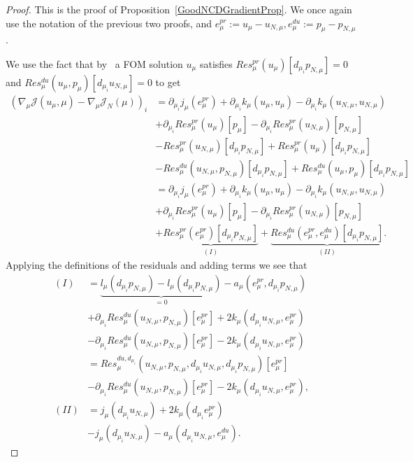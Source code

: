\begin{proof}
    This is the proof of Proposition~\ref{GoodNCDGradientProp}.
    We once again use the notation of the previous two proofs, and $e_\mu^{pr} := u_\mu - u_{N, \mu}, e_\mu^{du} := p_\mu - p_{N, \mu}$.

    We use the fact that by~\cite[Equations 3.1 and 3.2]{Keil2021} a FOM solution $u_\mu$ satisfies $Res_\mu^{pr}(u_\mu)[d_{\mu_i} p_{N, \mu}] = 0$ and $Res_\mu^{du}(u_\mu, p_\mu)[d_{\mu_i} u_{N, \mu}] = 0$ to get
    \begin{align}
        {\left( \nabla_\mu \mathcal{J}(u_\mu, \mu) - \nabla_\mu \mathcal{J}_N(\mu) \right)}_i &= \partial_{\mu_i} j_\mu(e_\mu^{pr}) + \partial_{\mu_i} k_\mu(u_\mu, u_\mu) - \partial_{\mu_i} k_\mu(u_{N, \mu}, u_{N, \mu}) \label{PrfEq5}\\
        &+ \partial_{\mu_i} Res_\mu^{pr}(u_\mu)[p_\mu] - \partial_{\mu_i} Res_\mu^{pr}(u_{N, \mu})[p_{N, \mu}] \nonumber\\
        &- Res_\mu^{pr}(u_{N, \mu})[d_{\mu_i} p_{N, \mu}] + Res_\mu^{pr}(u_\mu)[d_{\mu_i} p_{N, \mu}] \nonumber\\
        &- Res_\mu^{du}(u_{N, \mu}, p_{N, \mu})[d_{\mu_i} p_{N, \mu}] + Res_\mu^{du}(u_\mu, p_\mu)[d_{\mu_i} p_{N, \mu}] \nonumber\\
        &= \partial_{\mu_i} j_\mu(e_\mu^{pr}) + \partial_{\mu_i} k_\mu(u_\mu, u_\mu) - \partial_{\mu_i} k_\mu(u_{N, \mu}, u_{N, \mu}) \nonumber\\
        &+ \partial_{\mu_i} Res_\mu^{pr}(u_\mu)[p_\mu] - \partial_{\mu_i} Res_\mu^{pr}(u_{N, \mu})[p_{N, \mu}] \nonumber\\
        &+ \underbrace{Res_\mu^{pr}(e_\mu^{pr})[d_{\mu_i} p_{N, \mu}]}_{(I)} + \underbrace{Res_\mu^{du}(e_\mu^{pr}, e_\mu^{du})[d_{\mu_i} p_{N, \mu}]}_{(II)}. \nonumber
    \end{align}
    Applying the definitions of the residuals and adding terms we see that
    \begin{align}
        (I) &= \underbrace{l_\mu(d_{\mu_i} p_{N, \mu}) - l_\mu(d_{\mu_i} p_{N, \mu})}_{= 0} - a_\mu(e_\mu^{pr}, d_{\mu_i} p_{N, \mu}) \label{PrfEq6}\\
        &+ \partial_{\mu_i} Res_\mu^{du}(u_{N, \mu}, p_{N, \mu})[e_\mu^{pr}] + 2 k_\mu(d_{\mu_i} u_{N, \mu}, e_\mu^{pr}) \nonumber\\
        &- \partial_{\mu_i} Res_\mu^{du}(u_{N, \mu}, p_{N, \mu})[e_\mu^{pr}] - 2 k_\mu(d_{\mu_i} u_{N, \mu}, e_\mu^{pr}) \nonumber\\
        &= Res_\mu^{du, d_{\mu_i}}(u_{N, \mu}, p_{N, \mu}, d_{\mu_i} u_{N, \mu}, d_{\mu_i} p_{N, \mu})[e_\mu^{pr}] \nonumber\\
        &- \partial_{\mu_i} Res_\mu^{du}(u_{N, \mu}, p_{N, \mu})[e_\mu^{pr}] - 2 k_\mu(d_{\mu_i} u_{N, \mu}, e_\mu^{pr}), \nonumber\\
        (II) &= j_\mu(d_{\mu_i} u_{N, \mu}) + 2 k_\mu(d_{\mu_i} e_\mu^{pr}) \label{PrfEq7}\\
        &- j_\mu(d_{\mu_i} u_{N, \mu}) - a_\mu(d_{\mu_i} u_{N, \mu}, e_\mu^{du}). \nonumber
    \end{align}
\end{proof}